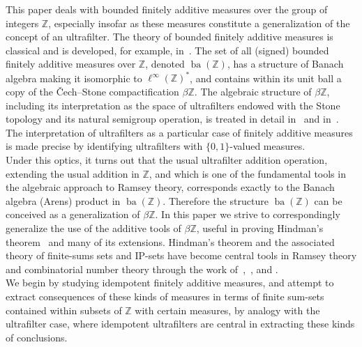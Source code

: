 \documentclass{jloganal}
\theoremstyle{definition}
\newcommand{\ba}{\mathop{\mathrm{ba}}}
\begin{document}
This paper deals with bounded finitely additive measures over the group of integers $\mathbb Z$, especially insofar as these measures constitute a generalization of the concept of an ultrafilter. The theory of bounded finitely additive measures is classical and is developed, for example, in~\cite{Dunford-Schwartz}. The set of all (signed) bounded finitely additive measures over $\mathbb Z$, denoted $\ba(\mathbb Z)$, has a structure of Banach algebra making it isomorphic to $\ell^\infty(\mathbb Z)^*$, and contains within its unit ball a copy of the \v{C}ech--Stone compactification $\beta\mathbb Z$. The algebraic structure of $\beta\mathbb Z$, including its interpretation as the space of ultrafilters endowed with the Stone topology and its natural semigroup operation, is treated in detail in~\cite{Hindman-Strauss} and in~\cite{comfort-negrepontis}. The interpretation of ultrafilters as a particular case of finitely additive measures is made precise by identifying ultrafilters with $\{0,1\}$-valued measures.\\
Under this optics, it turns out that the usual ultrafilter addition operation, extending the usual addition in $\mathbb Z$, and which is one of the fundamental tools in the algebraic approach to Ramsey theory, corresponds exactly to the Banach algebra (Arens) product in $\ba(\mathbb Z)$. Therefore the structure $\ba(\mathbb Z)$ can be conceived as a generalization of $\beta\mathbb Z$. In this paper we strive to correspondingly generalize the use of the additive tools of $\beta\mathbb Z$, useful in proving Hindman's theorem~\cite{hindman-thm} and many of its extensions. Hindman's theorem and the associated theory of finite-sums sets and IP-sets have become central tools in Ramsey theory and combinatorial number theory through the work of~\cite{hindman-ultrafiltersch},~\cite{Furstenberg2}, and \cite{Hindman-Strauss}.\\
We begin by studying idempotent finitely additive measures, and attempt to extract consequences of these kinds of measures in terms of finite sum-sets contained within subsets of $\mathbb Z$ with certain measures, by analogy with the ultrafilter case, where idempotent ultrafilters are central in extracting these kinds of conclusions.%
\end{document}
